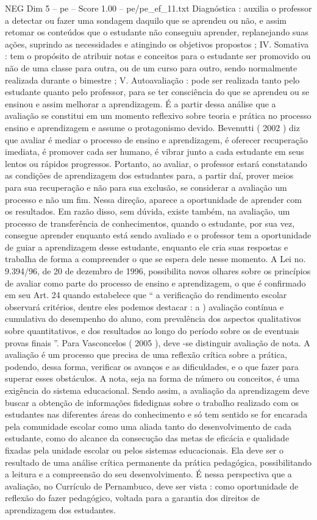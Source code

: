 \begin{textsample}{NEG Dim 5 – pe – Score 1.00 – pe/pe\_ef\_11.txt}
Diagnóstica : auxilia o professor a detectar ou fazer uma sondagem daquilo que se aprendeu ou não, e assim retomar os conteúdos que o estudante não conseguiu aprender, replanejando suas ações, suprindo as necessidades e atingindo os objetivos propostos ; IV.
Somativa : tem o propósito de atribuir notas e conceitos para o estudante ser promovido ou não de uma classe para outra, ou de um curso para outro, sendo normalmente realizada durante o bimestre ; V.
Autoavaliação : pode ser realizada tanto pelo estudante quanto pelo professor, para se ter consciência do que se aprendeu ou se ensinou e assim melhorar a aprendizagem.
É a partir dessa análise que a avaliação se constitui em um momento reflexivo sobre teoria e prática no processo ensino e aprendizagem e assume o protagonismo devido.
Bevenutti ( 2002 ) diz que avaliar é mediar o processo de ensino e aprendizagem, é oferecer recuperação imediata, é promover cada ser humano, é vibrar junto a cada estudante em seus lentos ou rápidos progressos.
Portanto, ao avaliar, o professor estará constatando as condições de aprendizagem dos estudantes para, a partir daí, prover meios para sua recuperação e não para sua exclusão, se considerar a avaliação um processo e não um fim.
Nessa direção, aparece a oportunidade de aprender com os resultados.
Em razão disso, sem dúvida, existe também, na avaliação, um processo de transferência de conhecimentos, quando o estudante, por sua vez, consegue aprender enquanto está sendo avaliado e o professor tem a oportunidade de guiar a aprendizagem desse estudante, enquanto ele cria suas respostas e trabalha de forma a compreender o que se espera dele nesse momento.
A Lei no. 9.394/96, de 20 de dezembro de 1996, possibilita novos olhares sobre os princípios de avaliar como parte do processo de ensino e aprendizagem, o que é confirmado em seu Art. 24 quando estabelece que “ a verificação do rendimento escolar observará critérios, dentre eles podemos destacar : a ) avaliação contínua e cumulativa do desempenho do aluno, com prevalência dos aspectos qualitativos sobre quantitativos, e dos resultados ao longo do período sobre os de eventuais provas finais ”.
Para Vasconcelos ( 2005 ), deve -se distinguir avaliação de nota.
A avaliação é um processo que precisa de uma reflexão crítica sobre a prática, podendo, dessa forma, verificar os avanços e as dificuldades, e o que fazer para superar esses obstáculos.
A nota, seja na forma de número ou conceitos, é uma exigência do sistema educacional.
Sendo assim, a avaliação da aprendizagem deve buscar a obtenção de informações fidedignas sobre o trabalho realizado com os estudantes nas diferentes áreas do conhecimento e só tem sentido se for encarada pela comunidade escolar como uma aliada tanto do desenvolvimento de cada estudante, como do alcance da consecução das metas de eficácia e qualidade fixadas pela unidade escolar ou pelos sistemas educacionais.
Ela deve ser o resultado de uma análise crítica permanente da prática pedagógica, possibilitando a leitura e a compreensão do seu desenvolvimento.
É nessa perspectiva que a avaliação, no Currículo de Pernambuco, deve ser vista : como oportunidade de reflexão do fazer pedagógico, voltada para a garantia dos direitos de aprendizagem dos estudantes.

\end{textsample}
